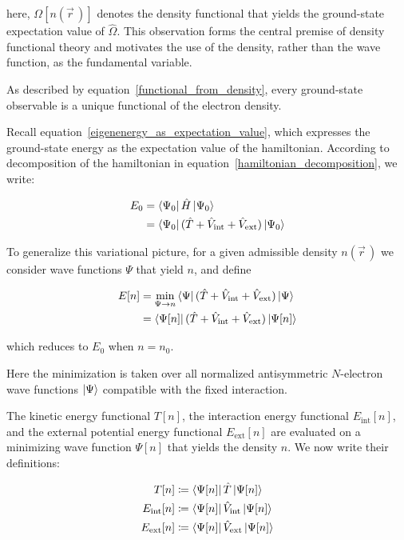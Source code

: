 here, $\Omega[n(\vec{r}\,)]$ denotes the density functional that yields the ground-state expectation value of $\hat{\Omega}$.
This observation forms the central premise of density functional theory and motivates the use of the density, rather than the wave function, as the fundamental variable.

As described by equation~\eqref{functional_from_density},
every ground-state observable is a unique functional of the electron density.

Recall equation~\eqref{eigenenergy_as_expectation_value}, which expresses the ground-state energy as the expectation value of the hamiltonian.
According to decomposition of the hamiltonian in equation~\eqref{hamiltonian_decomposition}, we write:

\begin{equation}
\begin{aligned}
    E_0
    &= \bra{\Psi_0}\hat{H}\ket{\Psi_0} \\
    &= \bra{\Psi_0}(\hat{T}+\hat{V}_\mathrm{int}+\hat{V}_\mathrm{ext})\ket{\Psi_0}
\end{aligned}
\label{groundstate_energy_decomposition}
\end{equation}

To generalize this variational picture, for a given admissible density $n(\vec{r}\,)$ we consider wave functions $\Psi$ that yield $n$, and define

\begin{equation}
\begin{aligned}
    E[n]
    &= \min_{\Psi\to n}\bra{\Psi}(\hat{T}+\hat{V}_\mathrm{int}+\hat{V}_\mathrm{ext})\ket{\Psi} \\
    &= \bra{\Psi[n]}(\hat{T}+\hat{V}_\mathrm{int}+\hat{V}_\mathrm{ext})\ket{\Psi[n]}
\end{aligned}
\label{functional_energy_constrained_search}
\end{equation}

which reduces to $E_0$ when $n=n_0$.

Here the minimization is taken over all normalized antisymmetric $N$-electron wave functions $\ket{\Psi}$ compatible with the fixed interaction.

The kinetic energy functional $T[n]$, the interaction energy functional $E_\mathrm{int}[n]$, and the external potential energy functional $E_\mathrm{ext}[n]$ are evaluated on a minimizing wave function $\Psi[n]$ that yields the density $n$. We now write their definitions:

\begin{equation}
\begin{aligned}
    T[n]&\coloneqq\bra{\Psi[n]}\hat{T}\ket{\Psi[n]} \\
    E_\mathrm{int}[n]&\coloneqq\bra{\Psi[n]}\hat{V}_\mathrm{int}\ket{\Psi[n]} \\
    E_\mathrm{ext}[n]&\coloneqq\bra{\Psi[n]}\hat{V}_\mathrm{ext}\ket{\Psi[n]}
\end{aligned}
\label{functional_T_Eint_Eext_definition}
\end{equation}

